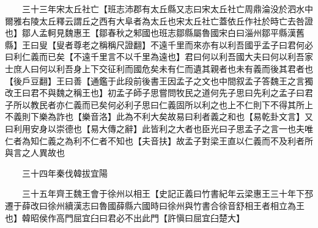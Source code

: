 　　三十三年宋太丘社亡【班志沛郡有太丘縣又志曰宋太丘社亡周鼎淪没於泗水中爾雅右陵太丘釋云謂丘之西有大阜者為太丘也宋太丘社亡蓋依丘作社於時亡去咎證也】鄒人孟軻見魏惠王【鄒春秋之邾國也班志鄒縣屬魯國宋白曰淄州鄒平縣漢舊縣】王曰叟【叟者尊老之稱稱尺證翻】不遠千里而來亦有以利吾國乎孟子曰君何必曰利仁義而已矣【不遠千里言不以千里為遠也】君曰何以利吾國大夫曰何以利吾家士庶人曰何以利吾身上下交征利而國危矣未有仁而遺其親者也未有義而後其君者也【後戶豆翻】王曰善【通鑑于此段前後書王因孟子之文也中間叙孟子答魏王之言獨改王曰君不與魏之稱王也】初孟子師子思嘗問牧民之道何先子思曰先利之孟子曰君子所以教民者亦仁義而已矣何必利子思曰仁義固所以利之也上不仁則下不得其所上不義則下樂為詐也【樂音洛】此為不利大矣故易曰利者義之和也【易乾卦文言】又曰利用安身以崇德也【易大傳之辭】此皆利之大者也臣光曰子思孟子之言一也夫唯仁者為知仁義之為利不仁者不知也【夫音扶】故孟子對梁王直以仁義而不及利者所與言之人異故也

　　三十四年秦伐韓拔宜陽

　　三十五年齊王魏王會于徐州以相王【史記正義曰竹書紀年云梁惠王三十年下邳遷于薛改曰徐州續漢志曰魯國薛縣六國時曰徐州與竹書合徐音舒相王者相立為王也】韓昭侯作高門屈宜臼曰君必不出此門【許愼曰屈宜臼楚大】

